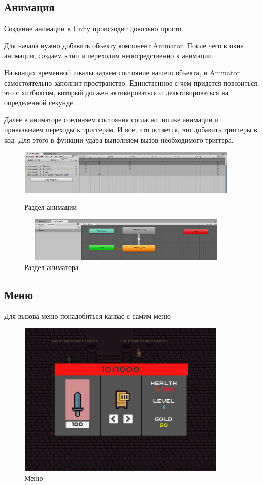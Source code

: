 \documentclass[a4paper,12pt]{article}
\begin{document}
\newpage
\subsection{Анимация}
Создание анимации в Unity происходит довольно просто.

Для начала нужно добавить объекту компонент Animator. После чего в окне анимации, создаем клип и переходим непосредственно к анимации.

На концах временной шкалы задаем состояние нашего объекта, и Animator самостоятельно заполнит пространство. Единственное с чем придется повозиться, это с хитбоксом, который должен активироваться и деактивироваться на определенной секунде.

Далее в аниматоре соединяем состояния согласно логике анимации и привязываем переходы к триггерам. И все, что остается, это добавить триггеры в код. Для этого в функции удара выполняем вызов необходимого триггера.

\begin{figure}[h!]
\centering
\includegraphics[width = 400px, height=80px]{pictures/anim1.png}
\caption{Раздел анимации}
\vspace{5mm}
\includegraphics[width = 400px, height=80px]{pictures/anim2.png}
\caption{Раздел аниматора}
\end{figure}

\newpage
\subsection{Меню}
Для вызова меню понадобиться канвас с самим меню

\begin{figure}[h]
\centering
\includegraphics[width = 380px, height=280px]{pictures/menu.png}
\caption{Меню}
\end{figure}
\end{document}

